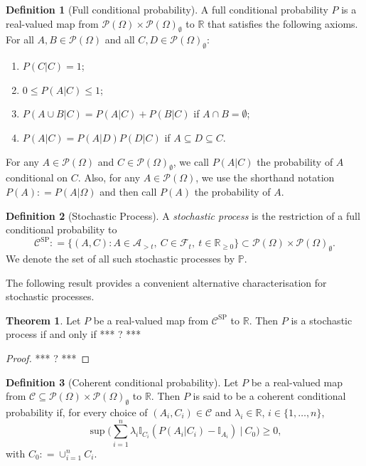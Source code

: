 \documentclass[10pt]{paper}
\theoremstyle{definition}
\newtheorem{theorem}{Theorem}
\newtheorem{definition}{Definition}
\newcommand{\reals}{\mathbb{R}}
\newcommand{\realsnonneg}{\reals_{\geq 0}}
\newcommand{\paths}{\Omega}
\newcommand{\power}{\mathcal{P}(\paths)}
\newcommand{\nonemptypower}{\power_{\emptyset}}
\newcommand{\filter}[1][t]{\mathcal{F}_{#1}}
\newcommand{\processes}{\mathbb{P}}
\newcommand{\ind}[1]{\mathbb{I}_{#1}}
\newcommand{\coloneqq}{:\!=}
\begin{document}
\begin{definition}[Full conditional probability]\label{def:cond_prob}
A full conditional probability $P$ is a real-valued map from $\power\times\nonemptypower$ to $\reals$ that satisfies the following axioms. For all $A,B\in\power$ and all \mbox{$C,D\in\nonemptypower$}:
\vspace{5pt}

\begin{enumerate}[label=F\arabic*:]
\item
$P(C\vert C)=1$;
\item
$0\leq P(A\vert C)\leq 1$;
\item
$P(A\cup B\vert C)=P(A\vert C)+P(B\vert C)$ if $A\cap B=\emptyset$;
\item
$P(A\vert C)=P(A\vert D)P(D\vert C)$ if $A\subseteq D\subseteq C$.
\end{enumerate}
\vspace{5pt}

\noindent
For any $A\in\power$ and $C\in\nonemptypower$, we call $P(A\vert C)$ the probability of $A$ conditional on $C$. Also, for any $A\in\power$, we use the shorthand notation $P(A)\coloneqq P(A\vert\paths)$ and then call $P(A)$ the probability of $A$.
\end{definition}

\begin{definition}[Stochastic Process]\label{def:stoch_process}
A \emph{stochastic process} is the restriction of a full conditional probability to
\begin{equation*}
\mathcal{C}^\mathrm{SP}\coloneqq\big\{
(A,C)
\colon
A\in\mathcal{A}_{>t},~C\in\filter,~t\in\realsnonneg\big\}\subset\power\times\nonemptypower.
\end{equation*}
We denote the set of all such stochastic processes by $\processes$.
\end{definition}

The following result provides a convenient alternative characterisation for stochastic processes.

\begin{theorem}
Let $P$ be a real-valued map from $\mathcal{C}^{\mathrm{SP}}$ to $\reals$. Then $P$ is a stochastic process if and only if *** ? ***
\end{theorem}
\begin{proof}
*** ? ***
\end{proof}

\begin{definition}[Coherent conditional probability]\label{def:coherence}
Let $P$ be a real-valued map from $\mathcal{C}\subseteq\power\times\nonemptypower$ to $\reals$. Then $P$ is said to be a coherent conditional probability if, for every choice of $(A_i,C_i)\in\mathcal{C}$ and $\lambda_i\in\reals$, $i\in\{1,\dots,n\}$,
\begin{equation*}
\sup\Big(\sum_{i=1}^n\lambda_i\ind{C_i}(P(A_i\vert C_i)-\ind{A_i})~\Big\vert~C_0\Big)\geq0,
\end{equation*}
with $C_0\coloneqq\cup_{i=1}^nC_i$.
\end{definition}
\end{document}
